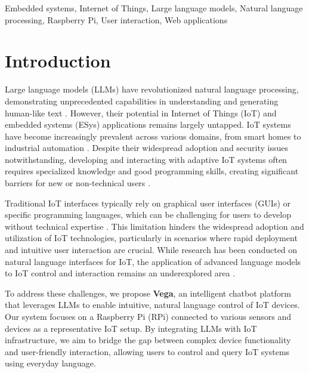\documentclass{ieeeaccess}
\begin{document}
\begin{keywords}
    Embedded systems, Internet of Things, Large language models, Natural language processing, Raspberry Pi, User interaction, Web applications
\end{keywords}

\titlepgskip=-21pt

\maketitle

\section{Introduction}\label{sec:introduction}

Large language models (LLMs) have revolutionized natural language processing, demonstrating unprecedented capabilities in understanding and generating human-like text \cite{10.1145/3641289}. However, their potential in Internet of Things (IoT) and embedded systems (ESys) applications remains largely untapped. IoT systems have become increasingly prevalent across various domains, from smart homes to industrial automation \cite{8355897}. Despite their widespread adoption and security issues notwithstanding, developing and interacting with adaptive IoT systems often requires specialized knowledge and good programming skills, creating significant barriers for new or non-technical users \cite{10.1145/3447526.3472036}.

Traditional IoT interfaces typically rely on graphical user interfaces (GUIs) or specific programming languages, which can be challenging for users to develop without technical expertise \cite{10.1145/3447526.3472036}. This limitation hinders the widespread adoption and utilization of IoT technologies, particularly in scenarios where rapid deployment and intuitive user interaction are crucial. While research has been conducted on natural language interfaces for IoT, the application of advanced language models to IoT control and interaction remains an underexplored area \cite{KASSAB2020102663}.

To address these challenges, we propose \textbf{Vega}, an intelligent chatbot platform that leverages LLMs to enable intuitive, natural language control of IoT devices. Our system focuses on a Raspberry Pi (RPi) connected to various sensors and devices as a representative IoT setup. By integrating LLMs with IoT infrastructure, we aim to bridge the gap between complex device functionality and user-friendly interaction, allowing users to control and query IoT systems using everyday language.
\end{document}
